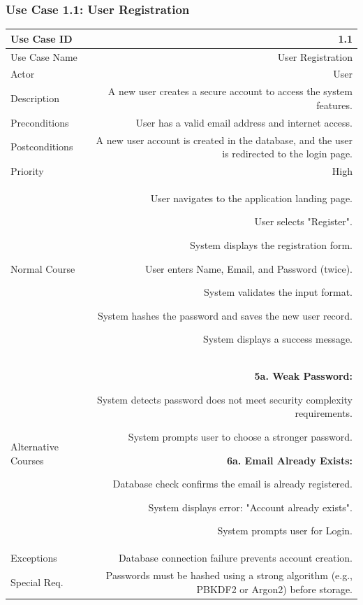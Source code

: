 \subsubsection{Use Case 1.1: User Registration}
\begin{tabularx}{\textwidth}{|L|R|}
	\hline
	Use Case ID & 1.1 \\ \hline
	Use Case Name & User Registration \\ \hline
	Actor & User \\ \hline
	Description & A new user creates a secure account to access the system features. \\ \hline
	Preconditions & User has a valid email address and internet access. \\ \hline
	Postconditions & A new user account is created in the database, and the user is redirected to the login page. \\ \hline
	Priority & High \\ \hline
	Normal Course & 
	\begin{normalsteps}
		\item User navigates to the application landing page.
		\item User selects "Register".
		\item System displays the registration form.
		\item User enters Name, Email, and Password (twice).
		\item System validates the input format.
		\item System hashes the password and saves the new user record.
		\item System displays a success message.
	\end{normalsteps} \\ \hline
	Alternative Courses & 
	\textbf{5a. Weak Password:} 
	\begin{altsteps}
		\item System detects password does not meet security complexity requirements.
		\item System prompts user to choose a stronger password.
	\end{altsteps} 
	\textbf{6a. Email Already Exists:} 
	\begin{altsteps}
		\item Database check confirms the email is already registered.
		\item System displays error: "Account already exists".
		\item System prompts user for Login.
	\end{altsteps} \\ \hline
	Exceptions & Database connection failure prevents account creation. \\ \hline
	Special Req. & Passwords must be hashed using a strong algorithm (e.g., PBKDF2 or Argon2) before storage. \\ \hline
\end{tabularx}

